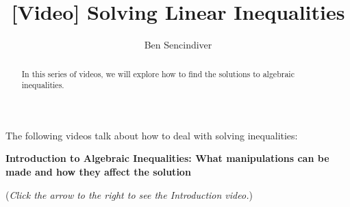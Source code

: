 \documentclass{ximera}
\title[Prerequisite Videos: ]{[Video] Solving Linear Inequalities}
\author{Ben Sencindiver}
\begin{document}
\begin{abstract}
  In this series of videos, we will explore how to find the solutions
  to algebraic inequalities. 
\end{abstract}
\maketitle

The following videos talk about how to deal with solving inequalities:


\textbf{Introduction to Algebraic Inequalities: What manipulations
can
be made and how they affect the solution}
\begin{flushright}
{\color{blue}(\emph{Click the arrow to the right to see the Introduction video.})}
\end{flushright}
\begin{center}
\begin{expandable}
\end{expandable}
\end{center}
\end{document}
